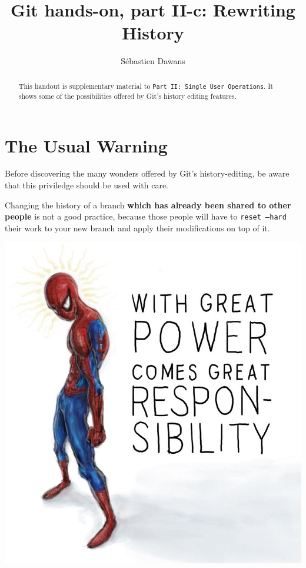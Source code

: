 \documentclass{../common/tufte-latex/tufte-handout}
\title{Git hands-on, part II-c: Rewriting History}
\author{S\'ebastien Dawans}
\begin{document}
\maketitle%

\begin{abstract}
\noindent
This handout is supplementary material to \texttt{Part II: Single User Operations}. It shows some of the possibilities offered by Git's history editing features.
\end{abstract}

\section{The Usual Warning}

Before discovering the many wonders offered by Git's history-editing, be aware that this priviledge should be used with care.

Changing the history of a branch \textbf{which has already been shared to other people} is not a good practice, because those people will have to \texttt{reset --hard} their work to your new branch and apply their modifications on top of it.

\begin{marginfigure}%
  \centering
  \includegraphics[width=\linewidth]{spiderman.jpg}
  \label{fig:spiderman}
\end{marginfigure}
\end{document}
